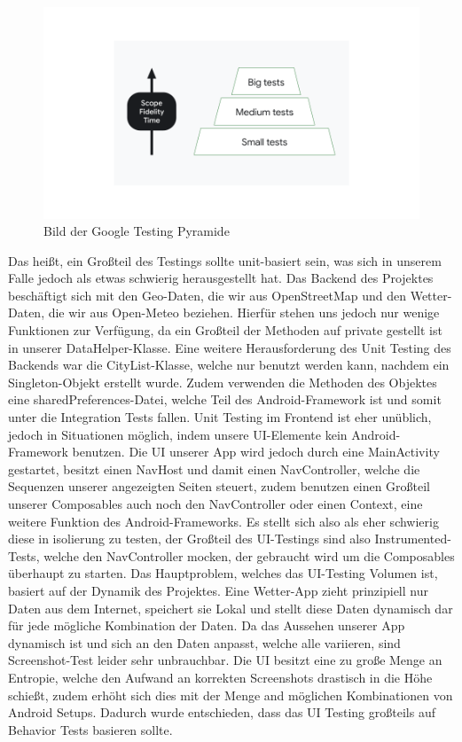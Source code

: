 \documentclass{article}
\begin{document}
\begin{figure}[h]
  \caption{Bild der Google Testing Pyramide}
  \centering
  \includegraphics[width=\textwidth]{testing_pyramid.png}
\end{figure}

Das heißt, ein Großteil des Testings sollte unit-basiert sein, was sich in unserem Falle jedoch als etwas schwierig herausgestellt hat. Das Backend des Projektes beschäftigt sich mit den Geo-Daten, die wir aus OpenStreetMap und den Wetter-Daten, die wir aus Open-Meteo beziehen. Hierfür stehen uns jedoch nur wenige Funktionen zur Verfügung, da ein Großteil der Methoden auf private gestellt ist in unserer DataHelper-Klasse. Eine weitere Herausforderung des Unit Testing des Backends war die CityList-Klasse, welche nur benutzt werden kann, nachdem ein Singleton-Objekt erstellt wurde. Zudem verwenden die Methoden des Objektes eine sharedPreferences-Datei, welche Teil des Android-Framework ist und somit unter die Integration Tests fallen. Unit Testing im Frontend ist eher unüblich, jedoch in Situationen möglich, indem unsere UI-Elemente kein Android-Framework benutzen. Die UI unserer App wird jedoch durch eine MainActivity gestartet, besitzt einen NavHost und damit einen NavController, welche die Sequenzen unserer angezeigten Seiten steuert, zudem benutzen einen Großteil unserer Composables auch noch den NavController oder einen Context, eine weitere Funktion des Android-Frameworks. Es stellt sich also als eher schwierig diese in isolierung zu testen, der Großteil des UI-Testings sind also Instrumented-Tests, welche den NavController mocken, der gebraucht wird um die Composables überhaupt zu starten. Das Hauptproblem, welches das UI-Testing Volumen ist, basiert auf der Dynamik des Projektes. Eine Wetter-App zieht prinzipiell nur Daten aus dem Internet, speichert sie Lokal und stellt diese Daten dynamisch dar für jede mögliche Kombination der Daten. Da das Aussehen unserer App dynamisch ist und sich an den Daten anpasst, welche alle variieren, sind Screenshot-Test leider sehr unbrauchbar. Die UI besitzt eine zu große Menge an Entropie, welche den Aufwand an korrekten Screenshots drastisch in die Höhe schießt, zudem erhöht sich dies mit der Menge and möglichen Kombinationen von Android Setups. Dadurch wurde entschieden, dass das UI Testing großteils auf Behavior Tests basieren sollte.
\end{document}

